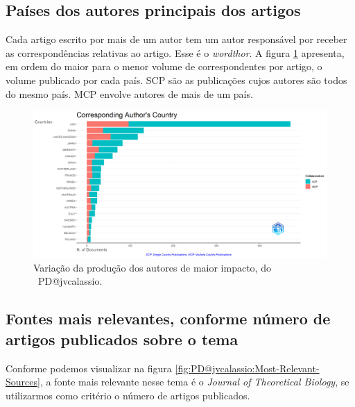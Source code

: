 \subsection{Países dos autores principais dos artigos}

Cada artigo escrito por mais de um autor tem um autor responsável por receber as correspondências relativas ao artigo. Esse é o  \textit{wordthor}. A figura \ref{fig:PD@jvcalassio:Corresponding-Authors-Country} apresenta, em ordem do maior para o menor volume de correspondentes por artigo, o volume publicado por cada país. SCP são as publicações cujos autores são todos do mesmo país. MCP envolve autores de mais de um país.

\begin{figure}
    \centering
    \includegraphics[width=1\textwidth]{exploratory-data-analysis/jvcalassio/PesqBibliogr/PrisonersDilemma/WoS-20221201/Dataset/MostRelevantCountries-2022-12-03.png}
    \caption{Variação da produção dos autores de maior impacto, do \dataset\ PD@jvcalassio.}
    \label{fig:PD@jvcalassio:Corresponding-Authors-Country}
\end{figure}

\subsection{Fontes mais relevantes, conforme número de artigos publicados sobre o tema}

Conforme podemos visualizar na figura \ref{fig:PD@jvcalassio:Most-Relevant-Sources}, a fonte mais relevante nesse tema é o \textit{Journal of Theoretical Biology}, se utilizarmos como critério o número de artigos publicados.

